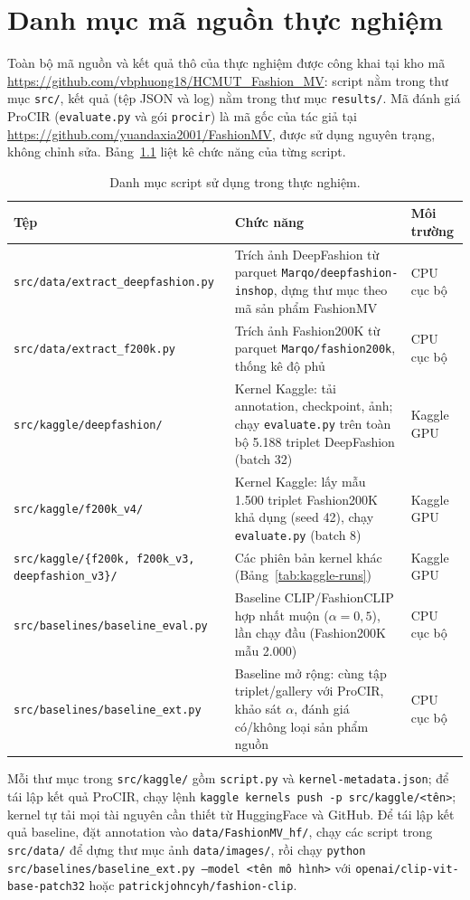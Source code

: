 \chapter{Danh mục mã nguồn thực nghiệm}\label{chapter:appendix-code}
\pagestyle{fancy}

Toàn bộ mã nguồn và kết quả thô của thực nghiệm được công khai tại kho mã \url{https://github.com/vbphuong18/HCMUT_Fashion_MV}: script nằm trong thư mục \texttt{src/}, kết quả (tệp JSON và log) nằm trong thư mục \texttt{results/}. Mã đánh giá ProCIR (\texttt{evaluate.py} và gói \texttt{procir}) là mã gốc của tác giả tại \url{https://github.com/yuandaxia2001/FashionMV}, được sử dụng nguyên trạng, không chỉnh sửa. Bảng~\ref{tab:scripts} liệt kê chức năng của từng script.

\begin{table}[h]
\centering
\caption{Danh mục script sử dụng trong thực nghiệm.}
\label{tab:scripts}
\small
\begin{tabular}{p{4.9cm}p{6.6cm}l}
\toprule
Tệp & Chức năng & Môi trường \\
\midrule
\texttt{src/data/extract\_deepfashion.py} & Trích ảnh DeepFashion từ parquet \texttt{Marqo/deepfashion-inshop}, dựng thư mục theo mã sản phẩm FashionMV & CPU cục bộ \\
\texttt{src/data/extract\_f200k.py} & Trích ảnh Fashion200K từ parquet \texttt{Marqo/fashion200k}, thống kê độ phủ & CPU cục bộ \\
\texttt{src/kaggle/deepfashion/} & Kernel Kaggle: tải annotation, checkpoint, ảnh; chạy \texttt{evaluate.py} trên toàn bộ 5.188 triplet DeepFashion (batch 32) & Kaggle GPU \\
\texttt{src/kaggle/f200k\_v4/} & Kernel Kaggle: lấy mẫu 1.500 triplet Fashion200K khả dụng (seed 42), chạy \texttt{evaluate.py} (batch 8) & Kaggle GPU \\
\texttt{src/kaggle/\{f200k, f200k\_v3, deepfashion\_v3\}/} & Các phiên bản kernel khác (Bảng~\ref{tab:kaggle-runs}) & Kaggle GPU \\
\texttt{src/baselines/baseline\_eval.py} & Baseline CLIP/FashionCLIP hợp nhất muộn ($\alpha = 0{,}5$), lần chạy đầu (Fashion200K mẫu 2.000) & CPU cục bộ \\
\texttt{src/baselines/baseline\_ext.py} & Baseline mở rộng: cùng tập triplet/gallery với ProCIR, khảo sát $\alpha$, đánh giá có/không loại sản phẩm nguồn & CPU cục bộ \\
\bottomrule
\end{tabular}
\end{table}

Mỗi thư mục trong \texttt{src/kaggle/} gồm \texttt{script.py} và \texttt{kernel-metadata.json}; để tái lập kết quả ProCIR, chạy lệnh \texttt{kaggle kernels push -p src/kaggle/<tên>}; kernel tự tải mọi tài nguyên cần thiết từ HuggingFace và GitHub. Để tái lập kết quả baseline, đặt annotation vào \texttt{data/FashionMV\_hf/}, chạy các script trong \texttt{src/data/} để dựng thư mục ảnh \texttt{data/images/}, rồi chạy \texttt{python src/baselines/baseline\_ext.py --model <tên mô hình>} với \texttt{openai/clip-vit-base-patch32} hoặc \texttt{patrickjohncyh/fashion-clip}.
